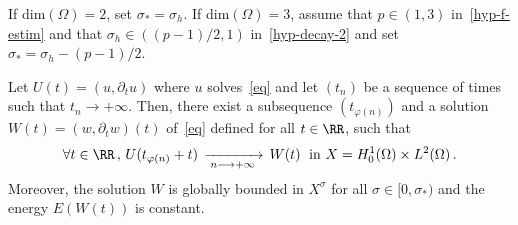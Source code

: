\begin{prop}\label{prop-asymp-compact-1}
If dim$(\Omega)=2$, set $\sigma_*=\sigma_h$. If dim$(\Omega)=3$, assume that $p\in(1,3)$ in~\eqref{hyp-f-estim} and that $\sigma_h\in ((p-1)/2,1)$ in~\eqref{hyp-decay-2} and set $\sigma_*=\sigma_h - (p-1)/2$.

Let $U(t)=(u,\partial_t u)$ where $u$ solves~\eqref{eq} and let $(t_n)$ be a sequence of times such that $t_n\rightarrow +\infty$. Then, there exist a subsequence $(t_{\varphi(n)})$ and a solution $W(t)=(w,\partial_t w)(t)$ of~\eqref{eq} defined for all $t\in\RR$, such that
\[
\forall
t\in\RR\,,\,U(t_{\varphi(n)}+t)\,\xrightarrow[\:n\longrightarrow
+\infty\;]{}\,W(t)\;\text{ in }X=H^1_0(\Omega)\times L^2(\Omega)\,.
\]
Moreover, the solution $W$ is globally bounded in $X^\sigma$ for all $\sigma\in [0,\sigma_*)$ and the energy $E(W(t))$ is constant.
\end{prop}
